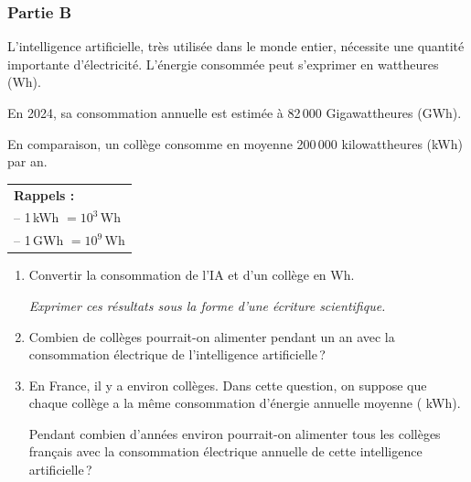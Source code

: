 \documentclass[exercice,a4]{thedocument}%
\begin{document}
\bigskip

\subsubsection*{Partie B}

L'intelligence artificielle, très utilisée dans le monde entier, nécessite une quantité importante d'électricité. L'énergie consommée peut s'exprimer en wattheures (Wh).

En 2024, sa consommation annuelle est estimée à 82\,000 Gigawattheures (GWh).

En comparaison, un collège consomme en moyenne 200\,000 kilowattheures (kWh) par an.

\medskip

\begin{center}
\begin{tabularx}{0.35\linewidth}{|X|}\hline
\textbf{Rappels :}\\
-- 1\,kWh $= 10^3$\,Wh\\
-- 1\,GWh $= 10^9$\,Wh\\ \hline
\end{tabularx}
\end{center}

\medskip

\begin{enumerate}[resume]
\item Convertir la consommation de l'IA et d'un collège en Wh.

\emph{Exprimer ces résultats sous la forme d'une écriture scientifique.}
\item Combien de collèges pourrait-on alimenter pendant un an avec la consommation électrique de l'intelligence artificielle\,?
\item En France, il y a environ  collèges. Dans cette question, on suppose que chaque collège a la même consommation d'énergie annuelle moyenne ( kWh).

Pendant combien d'années environ pourrait-on alimenter tous les collèges français avec la consommation électrique annuelle de cette intelligence artificielle\,?
\end{enumerate}


\medskip
\showthesource
\end{document}
